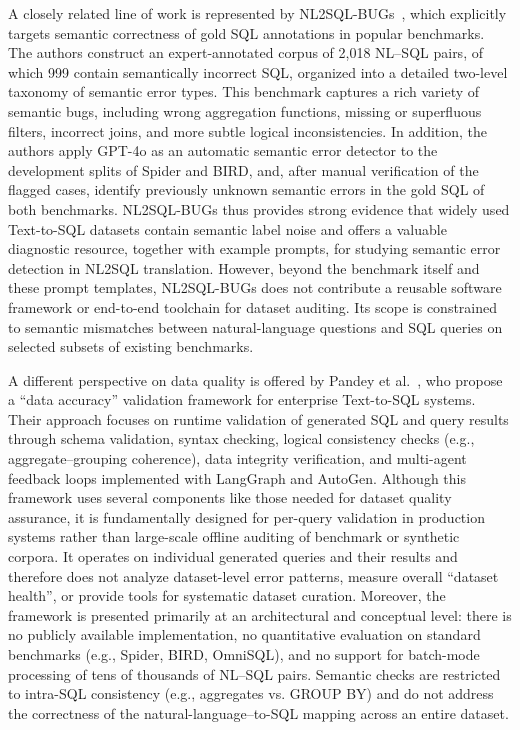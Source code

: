 \documentclass[print]{einformatica}
\begin{document}
A closely related line of work is represented by NL2SQL-BUGs~\cite{liu2025nl2sqlbugs}, which explicitly targets semantic correctness of gold SQL annotations in popular benchmarks. The authors construct an expert-annotated corpus of 2,018 NL--SQL pairs, of which 999 contain semantically incorrect SQL, organized into a detailed two-level taxonomy of semantic error types. This benchmark captures a rich variety of semantic bugs, including wrong aggregation functions, missing or superfluous filters, incorrect joins, and more subtle logical inconsistencies. In addition, the authors apply GPT-4o as an automatic semantic error detector to the development splits of Spider and BIRD, and, after manual verification of the flagged cases, identify previously unknown semantic errors in the gold SQL of both benchmarks. NL2SQL-BUGs thus provides strong evidence that widely used Text-to-SQL datasets contain semantic label noise and offers a valuable diagnostic resource, together with example prompts, for studying semantic error detection in NL2SQL translation. However, beyond the benchmark itself and these prompt templates, NL2SQL-BUGs does not contribute a reusable software framework or end-to-end toolchain for dataset auditing. Its scope is constrained to semantic mismatches between natural-language questions and SQL queries on selected subsets of existing benchmarks.

A different perspective on data quality is offered by Pandey et al.~\cite{pandey2024validation}, who propose a ``data accuracy'' validation framework for enterprise Text-to-SQL systems. Their approach focuses on runtime validation of generated SQL and query results through schema validation, syntax checking, logical consistency checks (e.g., aggregate--grouping coherence), data integrity verification, and multi-agent feedback loops implemented with LangGraph and AutoGen. Although this framework uses several components like those needed for dataset quality assurance, it is fundamentally designed for per-query validation in production systems rather than large-scale offline auditing of benchmark or synthetic corpora. It operates on individual generated queries and their results and therefore does not analyze dataset-level error patterns, measure overall ``dataset health'', or provide tools for systematic dataset curation. Moreover, the framework is presented primarily at an architectural and conceptual level: there is no publicly available implementation, no quantitative evaluation on standard benchmarks (e.g., Spider, BIRD, OmniSQL), and no support for batch-mode processing of tens of thousands of NL--SQL pairs. Semantic checks are restricted to intra-SQL consistency (e.g., aggregates vs. GROUP BY) and do not address the correctness of the natural-language--to-SQL mapping across an entire dataset.
\end{document}
